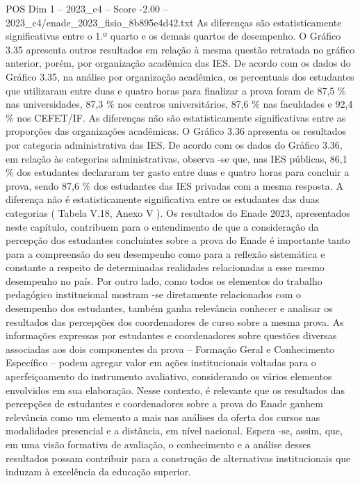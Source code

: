 \begin{textsample}{POS Dim 1 – 2023\_c4 – Score -2.00 – 2023\_c4/enade\_2023\_fisio\_8b895e4d42.txt}
As diferenças são estatisticamente significativas entre o 1.º quarto e os demais quartos de desempenho.
O Gráfico 3.35 apresenta outros resultados em relação à mesma questão retratada no gráfico anterior, porém, por organização acadêmica das IES.
De acordo com os dados do Gráfico 3.35, na análise por organização acadêmica, os percentuais dos estudantes que utilizaram entre duas e quatro horas para finalizar a prova foram de 87,5 \% nas universidades, 87,3 \% nos centros universitários, 87,6 \% nas faculdades e 92,4 \% nos CEFET/IF.
As diferenças não são estatisticamente significativas entre as proporções das organizações acadêmicas.
O Gráfico 3.36 apresenta os resultados por categoria administrativa das IES.
De acordo com os dados do Gráfico 3.36, em relação às categorias administrativas, observa -se que, nas IES públicas, 86,1 \% dos estudantes declararam ter gasto entre duas e quatro horas para concluir a prova, sendo 87,6 \% dos estudantes das IES privadas com a mesma resposta.
A diferença não é estatisticamente significativa entre os estudantes das duas categorias ( Tabela V.18, Anexo V ).
Os resultados do Enade 2023, apresentados neste capítulo, contribuem para o entendimento de que a consideração da percepção dos estudantes concluintes sobre a prova do Enade é importante tanto para a compreensão do seu desempenho como para a reflexão sistemática e constante a respeito de determinadas realidades relacionadas a esse mesmo desempenho no país.
Por outro lado, como todos os elementos do trabalho pedagógico institucional mostram -se diretamente relacionados com o desempenho dos estudantes, também ganha relevância conhecer e analisar os resultados das percepções dos coordenadores de curso sobre a mesma prova.
As informações expressas por estudantes e coordenadores sobre questões diversas associadas aos dois componentes da prova – Formação Geral e Conhecimento Específico – podem agregar valor em ações institucionais voltadas para o aperfeiçoamento do instrumento avaliativo, considerando os vários elementos envolvidos em sua elaboração.
Nesse contexto, é relevante que os resultados das percepções de estudantes e coordenadores sobre a prova do Enade ganhem relevância como um elemento a mais nas análises da oferta dos cursos nas modalidades presencial e a distância, em nível nacional.
Espera -se, assim, que, em uma visão formativa de avaliação, o conhecimento e a análise desses resultados possam contribuir para a construção de alternativas institucionais que induzam à excelência da educação superior.

\end{textsample}
